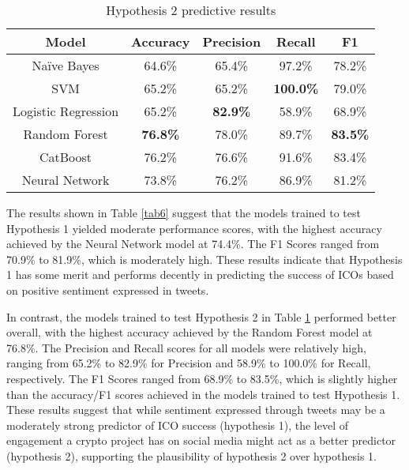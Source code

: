 \documentclass[runningheads]{llncs}
\begin{document}

\begin{table}[htbp]
\caption{Hypothesis 2 predictive results}
\begin{center}
\begin{tabular}{|c|c|c|c|c|}
\hline
\textbf{Model} & \textbf{Accuracy} & \textbf{Precision} & \textbf{Recall} & \textbf{F1} \\
\hline
Naïve Bayes & 64.6\% & 65.4\% & 97.2\% & 78.2\% \\
\hline
SVM & 65.2\% & 65.2\% & \textbf{100.0\%} & 79.0\% \\
\hline
Logistic Regression & 65.2\% & \textbf{82.9\%} & 58.9\% & 68.9\% \\
\hline
Random Forest & \textbf{76.8\%} & 78.0\% & 89.7\% & \textbf{83.5\%} \\
\hline
CatBoost & 76.2\% & 76.6\% & 91.6\% & 83.4\% \\
\hline
Neural Network & 73.8\% & 76.2\% & 86.9\% & 81.2\% \\
\hline
\end{tabular}
\label{tab7}
\end{center}
\end{table}

The results shown in Table \ref{tab6} suggest that the models trained to test Hypothesis 1 yielded moderate performance scores, with the highest accuracy achieved by the Neural Network model at 74.4\%. The F1 Scores ranged from 70.9\% to 81.9\%, which is moderately high. These results indicate that Hypothesis 1 has some merit and performs decently in predicting the success of ICOs based on positive sentiment expressed in tweets.

In contrast, the models trained to test Hypothesis 2 in Table \ref{tab7} performed better overall, with the highest accuracy achieved by the Random Forest model at 76.8\%. The Precision and Recall scores for all models were relatively high, ranging from 65.2\% to 82.9\% for Precision and 58.9\% to 100.0\% for Recall, respectively. The F1 Scores ranged from 68.9\% to 83.5\%, which is slightly higher than the accuracy/F1 scores achieved in the models trained to test Hypothesis 1. These results suggest that while sentiment expressed through tweets may be a moderately strong predictor of ICO success (hypothesis 1), the level of engagement a crypto project has on social media might act as a better predictor (hypothesis 2), supporting the plausibility of hypothesis 2 over hypothesis 1.
\end{document}

